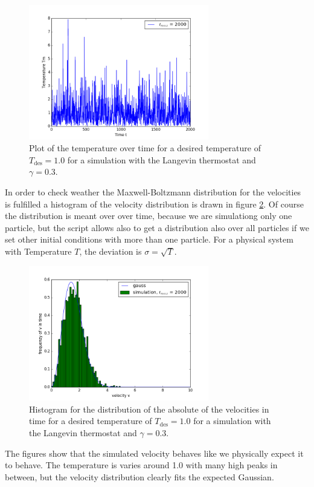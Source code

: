 \begin{figure}[ht]
	\centering
	\includegraphics[width=0.7\textwidth]{../dat/langevin_T1d0_gamma0d3_Tm.png}
	\caption{
		Plot of the temperature over time for a desired temperature of $T_\text{des}=1.0$ for a simulation with the Langevin thermostat and $\gamma =0.3$.
	}
	\label{langevinT}
\end{figure}

In order to check weather the Maxwell-Boltzmann distribution for the velocities is fulfilled a histogram of the velocity distribution is drawn in figure \ref{langevinvv}.
Of course the distribution is meant over over time, because we are simulationg only one particle, but the script allows also to get a distribution also over all particles if we set other initial conditions with more than one particle.
For a physical system with Temperature $T$, the deviation is $\sigma =\sqrt{T}$.


\begin{figure}[ht]
	\centering
	\includegraphics[width=0.7\textwidth]{../dat/langevin_T1d0_gamma0d3_vv.png}
	\caption{
		Histogram for the distribution of the absolute of the velocities in time for a desired temperature of $T_\text{des}=1.0$ for a simulation with the Langevin thermostat and $\gamma =0.3$.
	}
	\label{langevinvv}
\end{figure}

The figures show that the simulated velocity behaves like we physically expect it to behave. 
The temperature is varies around 1.0 with many high peaks in between, but the velocity distribution clearly fits the expected Gaussian.

\FloatBarrier